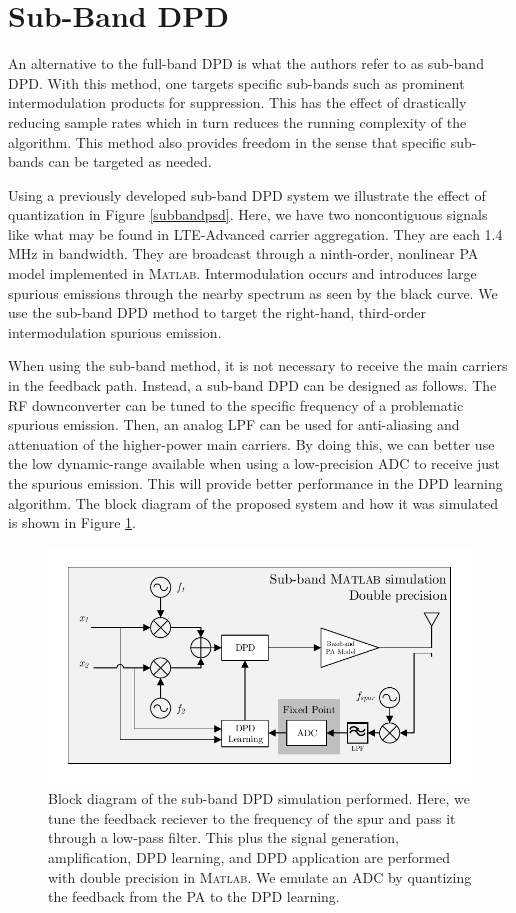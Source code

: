 \documentclass[conference]{IEEEtran}
\begin{document}
\section{Sub-Band DPD}
An alternative to the full-band DPD is what the authors refer to as sub-band DPD. 
With this method, one targets specific sub-bands such as prominent intermodulation products for suppression. 
This has the effect of drastically reducing sample rates which in turn reduces the running complexity of the algorithm. 
This method also provides freedom in the sense that specific sub-bands can be targeted as needed. 

Using a previously developed sub-band DPD system \cite{TMTT_SubbandDPD} we illustrate the effect of quantization in Figure \ref{subbandpsd}. Here, we have two noncontiguous signals like what may be found in LTE-Advanced carrier aggregation. They are each 1.4 MHz in bandwidth. They are broadcast through a ninth-order, nonlinear PA model implemented in \textsc{Matlab}. 
Intermodulation occurs and introduces large spurious emissions through the nearby spectrum as seen by the black curve. We use the sub-band DPD method to target the right-hand, third-order intermodulation spurious emission.

When using the sub-band method, it is not necessary to receive the main carriers in the feedback path.
Instead, a sub-band DPD can be designed as follows. 
The RF downconverter can be tuned to the specific frequency of a problematic spurious emission.
Then, an analog LPF can be used for anti-aliasing and attenuation of the higher-power main carriers. 
By doing this, we can better use the low dynamic-range available when using a low-precision ADC to receive just the spurious emission.
This will provide better performance in the DPD learning algorithm. 
The block diagram of the proposed system and how it was simulated is shown in Figure \ref{block2}.

\begin{figure}[]
	\centering
	\includegraphics[width=\columnwidth]{SubBand}
	\caption{Block diagram of the sub-band DPD simulation performed. Here, we tune the feedback reciever to the frequency of the spur and pass it through a low-pass filter. This plus the signal generation, amplification, DPD learning, and DPD application are performed with double precision in \textsc{Matlab}. We emulate an ADC by quantizing the feedback from the PA to the DPD learning.}
	\label{block2}
\end{figure}
\end{document}

